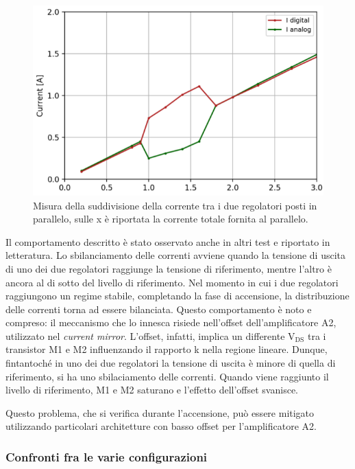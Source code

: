 \begin{figure}
\centering
\includegraphics[scale=.4]{Immagini/CurrentSharing}
\caption{Misura della suddivisione della corrente tra i due regolatori posti in parallelo, sulle x è riportata la corrente totale fornita al parallelo.}%
\label{CurrentSharing}
\end{figure}
Il comportamento descritto è stato osservato anche in altri test e riportato in letteratura\cite{SLDO}. 
Lo sbilanciamento delle correnti avviene quando la tensione di uscita di uno dei due regolatori raggiunge la tensione di riferimento, mentre l'altro è ancora al di sotto del livello di riferimento. 
Nel momento in cui i due regolatori raggiungono un regime stabile, completando la fase di accensione, la distribuzione delle correnti torna ad essere bilanciata. 
Questo comportamento è noto e compreso: il meccanismo che lo innesca risiede nell'offset dell'amplificatore A2, utilizzato nel \textit{current mirror}. 
L'offset, infatti, implica un differente $\mathrm{V_{DS}}$ tra i transistor M1 e M2 influenzando il rapporto k nella regione lineare.
Dunque, fintantoché in uno dei due regolatori la tensione di uscita è minore di quella di riferimento, si ha uno sbilaciamento delle correnti. 
Quando viene raggiunto il livello di riferimento, M1 e M2 saturano e l'effetto dell'offset svanisce.

Questo problema, che si verifica durante l'accensione, può essere mitigato utilizzando particolari architetture con basso offset per l'amplificatore A2.

\subsubsection{Confronti fra le varie configurazioni}

